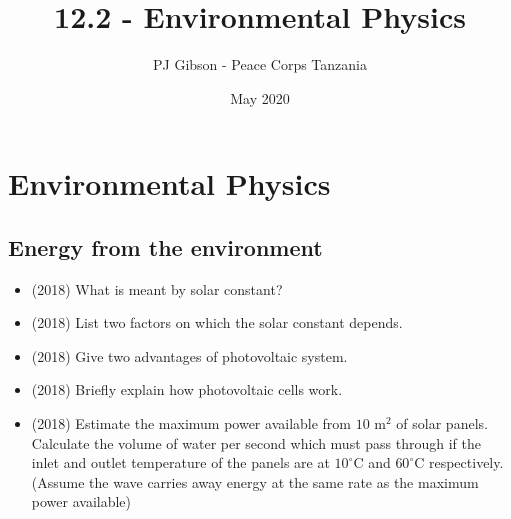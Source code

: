 \documentclass{article}
\title{12.2 - Environmental Physics}
\author{PJ Gibson - Peace Corps Tanzania}
\date{May 2020}
\begin{document}
\maketitle


\section{Environmental Physics}

\subsection{Energy from the environment}
\begin{itemize}
\item (2018)  What is meant by solar constant? 
\item (2018)  List two factors on which the solar constant depends. 
\item (2018)  Give two advantages of photovoltaic system. 
\item (2018)  Briefly explain how photovoltaic cells work. 
\item (2018)  Estimate the maximum power available from $ 10$ m$ ^{2}$ of solar panels.  Calculate the volume of water per second which must pass through if the inlet and outlet temperature of the panels are at $ 10^{\circ}$C and $ 60^{\circ}$C respectively. (Assume the wave carries away energy at the same rate as the maximum power available)
\end{itemize}
\end{document}
